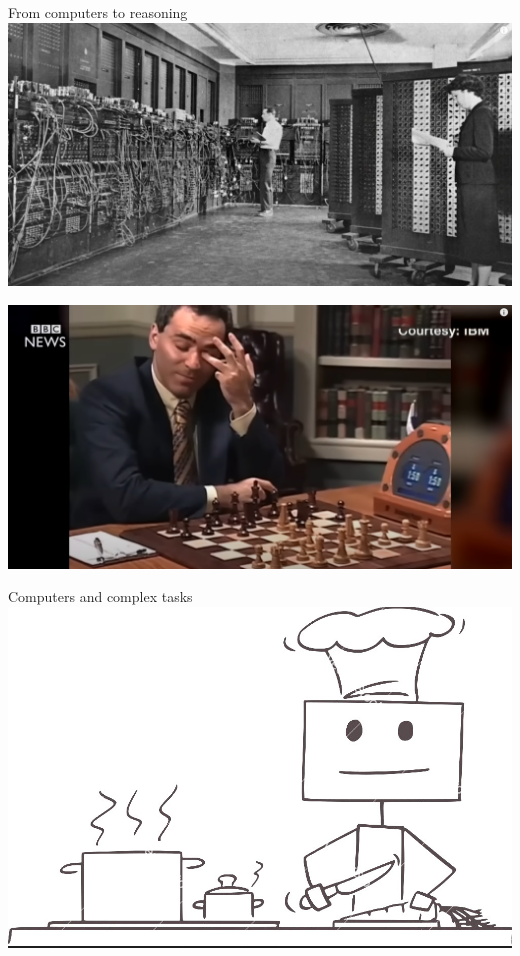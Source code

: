\documentclass{beamer}
\begin{document}
\begin{frame}{From computers to reasoning}
    \includegraphics[scale = 0.15]{pics/computer.png}  

\vspace{-0.1in}
\hspace{2in}
    \includegraphics[scale=0.15]{pics/kasparov.png}
\end{frame}


\begin{frame}{Computers and complex tasks}
\centering
\includegraphics[scale=0.28]{pics/robot_cooking.jpg}
\end{frame}
\end{document}
